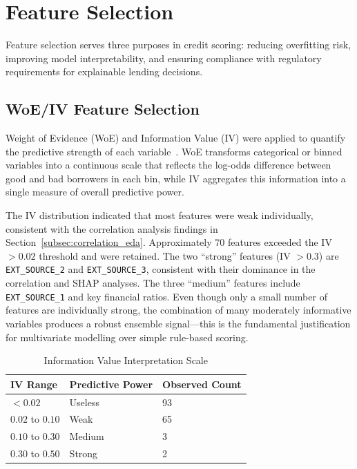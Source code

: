 \FloatBarrier

\section{Feature Selection}
\label{sec:feature_selection}

Feature selection serves three purposes in credit scoring: reducing overfitting risk, improving model interpretability, and ensuring compliance with regulatory requirements for explainable lending decisions.

\subsection{WoE/IV Feature Selection}

Weight of Evidence (WoE) and Information Value (IV) were applied to quantify the predictive strength of each variable~\cite{siddiqi2012}. WoE transforms categorical or binned variables into a continuous scale that reflects the log-odds difference between good and bad borrowers in each bin, while IV aggregates this information into a single measure of overall predictive power.


The IV distribution indicated that most features were weak individually, consistent with the correlation analysis findings in Section~\ref{subsec:correlation_eda}. Approximately 70 features exceeded the IV $> 0.02$ threshold and were retained. The two ``strong'' features (IV $> 0.3$) are \texttt{EXT\_SOURCE\_2} and \texttt{EXT\_SOURCE\_3}, consistent with their dominance in the correlation and SHAP analyses. The three ``medium'' features include \texttt{EXT\_SOURCE\_1} and key financial ratios. Even though only a small number of features are individually strong, the combination of many moderately informative variables produces a robust ensemble signal---this is the fundamental justification for multivariate modelling over simple rule-based scoring.

\begin{table}[H]
\centering
\caption{Information Value Interpretation Scale}
\label{tab:iv_scale}
\begin{tabular}{lll}
\toprule
\textbf{IV Range} & \textbf{Predictive Power} & \textbf{Observed Count} \\
\midrule
$< 0.02$ & Useless & 93 \\
$0.02$ to $0.10$ & Weak & 65 \\
$0.10$ to $0.30$ & Medium & 3 \\
$0.30$ to $0.50$ & Strong & 2 \\
\bottomrule
\end{tabular}
\end{table}

